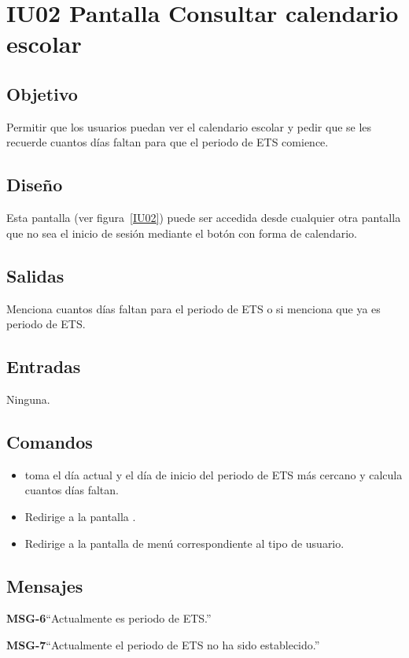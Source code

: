 
\section{IU02 Pantalla Consultar calendario escolar}

\subsection{Objetivo}
Permitir que los usuarios puedan ver el calendario escolar y pedir que se les recuerde cuantos días faltan para que el periodo de ETS comience.
\subsection{Diseño}
    Esta pantalla  (ver figura~\ref{IU02}) puede ser accedida desde cualquier otra pantalla que no sea el inicio de sesión mediante el botón con forma de calendario.


\newpage


\subsection{Salidas}

    Menciona cuantos días faltan para el periodo de ETS o si menciona que ya es periodo de ETS.

\subsection{Entradas}
   Ninguna.

\subsection{Comandos}
\begin{itemize}
    \item {} toma el día actual y el día de inicio del periodo de ETS más cercano y calcula cuantos días faltan.
    \item {} Redirige a la pantalla .
    \item {} Redirige a la pantalla de menú correspondiente al tipo de usuario.
\end{itemize}

\subsection{Mensajes}
     
\begin{Citemize}
    \item {\bf MSG-6}{``Actualmente es periodo de ETS.''}

    \item {\bf MSG-7}{``Actualmente el periodo de ETS no ha sido establecido.''}
\end{Citemize}

